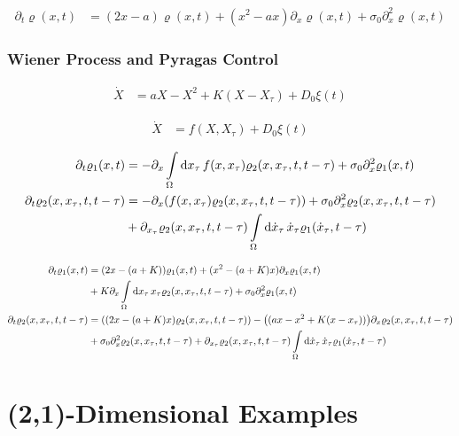 \documentclass[a4paper,10pt]{article}
\newcommand{\intl}{\int\limits}
\begin{document}
\begin{align}
	\partial_t
	\varrho(x,t)
	&=
	(2x-a)
	\varrho(x,t)
	+
	(x^2-ax)
	\partial_x
	\varrho(x,t)
	+
	\sigma_0
	\partial_x^2
	\varrho(x,t)	
\end{align}

\subsubsection{Wiener Process and Pyragas Control}

\begin{align}
	\dot{X}
	&=
	aX
	-
	X^2
	+
	K
	(X-X_\tau)	
	+
	D_0
	\xi(t)
\end{align}

\begin{align}
	\dot{X}
	&=
	f(X,X_\tau)
	+
	D_0
	\xi(t)
\end{align}


\begin{align}
	\partial_t
	\varrho_1(x,t)
	&=
	-
	\partial_x
	\intl_\Omega\dd{x_\tau}
	f(x,x_\tau)
	\varrho_2(x,x_\tau,t,t-\tau)
	+
	\sigma_0
	\partial_x^2
	\varrho_1(x,t)
\\
	\partial_t
	\varrho_2(x,x_\tau,t,t-\tau)
	&=
	-
	\partial_x
	\pqty{
		f(x,x_\tau)
		\varrho_2(x,x_\tau,t,t-\tau)
	}
	+
	\sigma_0
	\partial_x^2
	\varrho_2(x,x_\tau,t,t-\tau)
\\
	&+
	\partial_{x_\tau}
	\varrho_2(x,x_\tau,t,t-\tau)
	\intl_{\Omega}\dd{\dot{x}_\tau}
	\dot{x}_\tau
	\varrho_1(\dot{x}_\tau,t-\tau)
\end{align}

\begin{align}
	\partial_t
	\varrho_1(x,t)
	&=
	(2x-(a+K))
	\varrho_1(x,t)
	+
	(x^2-(a+K)x)
	\partial_x
	\varrho_1(x,t)
\\
	&+
	K	
	\partial_x
	\intl_\Omega\dd{x_\tau}
	x_\tau
	\varrho_2(x,x_\tau,t,t-\tau)
	+
	\sigma_0
	\partial_x^2
	\varrho_1(x,t)
\\
	\partial_t
	\varrho_2(x,x_\tau,t,t-\tau)
	&=
	\pqty{
		(2x-(a+K)x)
		\varrho_2(x,x_\tau,t,t-\tau)
	}
	-
	\pqty{
		(ax-x^2+K(x-x_\tau))
	}
	\partial_x
	\varrho_2(x,x_\tau,t,t-\tau)
\\
	&+
	\sigma_0
	\partial_x^2
	\varrho_2(x,x_\tau,t,t-\tau)
	+
	\partial_{x_\tau}
	\varrho_2(x,x_\tau,t,t-\tau)
	\intl_{\Omega}\dd{\dot{x}_\tau}
	\dot{x}_\tau
	\varrho_1(\dot{x}_\tau,t-\tau)
\end{align}

\newpage

\section{(2,1)-Dimensional Examples}
\end{document}
